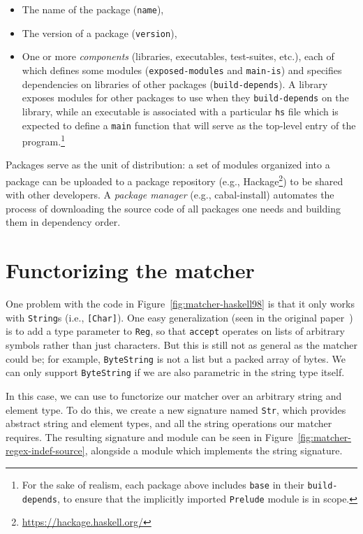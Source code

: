 \begin{itemize}
    \item The name of the package (\verb|name|),
    \item The version of a package (\verb|version|),
    \item One or more \emph{components} (libraries, executables,
    test-suites, etc.), each of which defines some modules
    (\verb|exposed-modules| and \verb|main-is|) and specifies
    dependencies on libraries of other packages (\verb|build-depends|).
    A library exposes modules for other packages to use when
    they \verb|build-depends| on the library, while an
    executable is associated with a particular \verb|hs| file
    which is expected to define a \verb|main| function that
    will serve as the top-level entry of the program.\footnote{For the
    sake of realism, each package above includes \texttt{base} in their
    \texttt{build-depends}, to ensure that the implicitly imported
    \texttt{Prelude} module is in scope.}
\end{itemize}
Packages serve as the unit of distribution: a set of modules organized
into a package can be uploaded to a package repository (e.g., Hackage\footnote{\url{https://hackage.haskell.org/}})
to be shared with other developers.  A \emph{package
manager} (e.g., cabal-install) automates the process of downloading the source code of all
packages one needs and building them in dependency order.

\section{Functorizing the matcher}

One problem with the code in Figure~\ref{fig:matcher-haskell98} is that
it only works with \verb|String|s (i.e., \verb|[Char]|).  One easy
generalization (seen in the original
paper~\cite{Fischer:2010:PRE:1863543.1863594}) is to add a type
parameter to \verb|Reg|, so that \verb|accept| operates on lists of
arbitrary symbols rather than just characters.  But this is still not as
general as the matcher could be; for example,
\verb|ByteString| is not a list but a packed array of bytes.
We can only support \verb|ByteString| if we are also parametric in the string type itself.

In this case, we can use \Backpack{} to functorize our matcher over an
arbitrary string and element type.  To do this, we create a new
signature named \verb|Str|, which provides abstract string and element
types, and all the string operations our matcher requires.
The resulting signature and module can be seen in
Figure~\ref{fig:matcher-regex-indef-source}, alongside a module which
implements the string signature.

